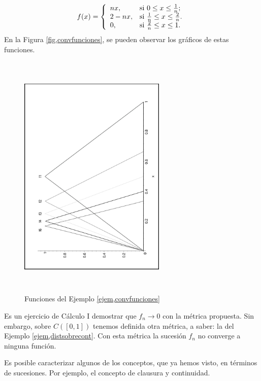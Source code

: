 \begin{ejemplo}
\[
    f(x)=\left\{%
\begin{array}{ll}
    nx, & \hbox{si $0\leq x\leq \frac1n$;} \\
    2-nx, & \hbox{si $\frac1n\leq x\leq \frac2n$.} \\
    0,    &\hbox{si $\frac2n\leq x\leq 1.$}
\end{array}%
\right.
\]
En la Figura \vref{fig,convfunciones}, se pueden observar los
gr\'aficos de estas funciones.
\begin{figure}
\begin{center}
    \includegraphics[height=12cm, width=7cm, angle=-90]{funciones0.eps}
    \caption{Funciones del Ejemplo
    \ref{ejem,convfunciones}}\label{fig,convfunciones}
\end{center}
\end{figure}
Es un ejercicio de C\'alculo I demostrar que $f_n\rightarrow 0$
con la m\'etrica propuesta. Sin embargo, sobre $C([0,1])$ tenemos
definida otra m\'etrica, a saber: la del Ejemplo
\vref{ejem,distsobrecont}. Con esta m\'etrica la sucesi\'on $f_n$
no converge a ninguna funci\'on.
\end{ejemplo}

Es posible caracterizar algunos de los conceptos, que ya hemos
visto, en t\'erminos de sucesiones. Por ejemplo, el concepto de
clausura y continuidad.


